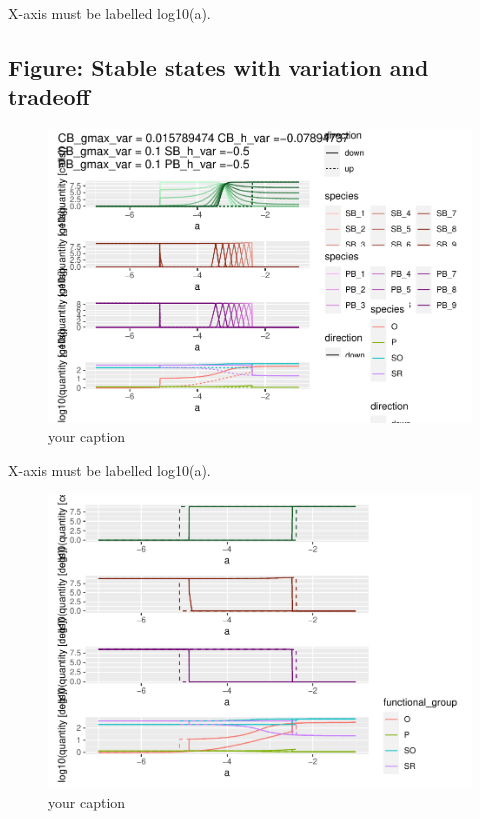 \documentclass{article}
\begin{document}
X-axis must be labelled log10(a).

\hypertarget{figure-stable-states-with-variation-and-tradeoff}{%
\subsection{Figure: Stable states with variation and
tradeoff}\label{figure-stable-states-with-variation-and-tradeoff}}

\begin{figure}

{\centering \includegraphics[width=1\linewidth]{article_files/figure-latex/ss_var-1} 

}

\caption{your caption}\label{fig:ss_var}
\end{figure}

X-axis must be labelled log10(a).

\begin{figure}

{\centering \includegraphics[width=1\linewidth]{article_files/figure-latex/ss_var2-1} 

}

\caption{your caption}\label{fig:ss_var2}
\end{figure}
\end{document}
